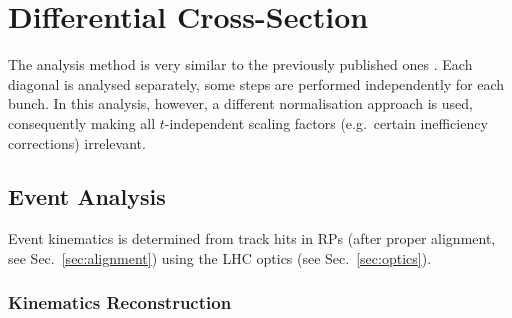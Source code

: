 \section{Differential Cross-Section}

The analysis method is very similar to the previously published ones \cite{epl101-el,prl111}. Each diagonal is analysed separately, some steps are performed independently for each bunch. In this analysis, however, a different normalisation approach is used, consequently making all $t$-independent scaling factors (e.g.~certain inefficiency corrections) irrelevant.

\subsection{Event Analysis}

Event kinematics is determined from track hits in RPs (after proper alignment, see Sec.~\ref{sec:alignment}) using the LHC optics (see Sec.~\ref{sec:optics}).


\subsubsection{Kinematics Reconstruction}
\label{sec:kinematics}

